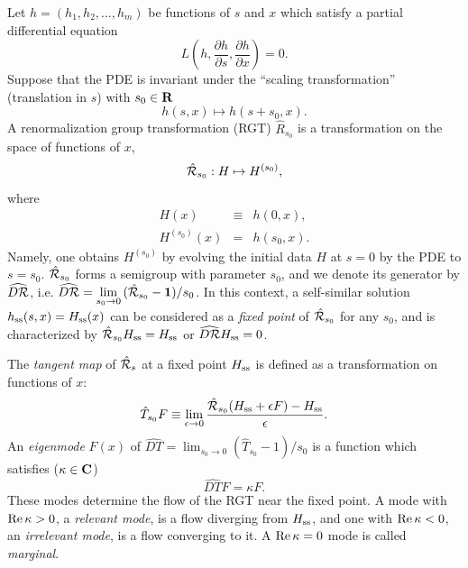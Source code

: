 Let $h=(h_1, h_2, ..., h_m)$ be functions of $s$ and $x$
which satisfy a partial differential equation
\begin{equation}
  \label{eq:PDE}
  L(h,\frac{\partial h}{\partial s},\frac{\partial h}{\partial x}) =0.
\end{equation}
Suppose that the PDE is invariant under the ``scaling transformation''
(translation in $s$) with $s_0 \in {\bf R}$
\begin{equation}
        h(s,x) \mapsto
        h(s+ s_0,  x).
\end{equation}
A renormalization group transformation (RGT)
$\hat R_{s_0}$ is a transformation on the space of functions of $x$,
\begin{equation}
        \hat{\cal R}_{s_0}: H  \mapsto H^{(s_0)} ,
\end{equation}
where
\begin{eqnarray}
        H(x) & \equiv & h(0,x), \\
        H^{(s_0)}(x) & = &
        h(s_0,  x).
\end{eqnarray}
Namely, one obtains $H^{(s_0)}$ by evolving the initial data $H$
at $s=0$ by the PDE to $s=s_0$.
$\hat {\cal R}_{s_0}$ forms a semigroup with parameter $s_0$, and we
denote its generator by $\widehat{D{\cal R}}$, i.e.
$ \displaystyle \widehat{ D{\cal R} }
        = \lim_{{s_0}\rightarrow 0}{(\hat{\cal R}_{s_0}-{\bf 1}) / s_0}$.
In this context, a  self-similar solution $h_{\rm ss}(s,x) = H_{\rm ss}(x)$
can be
considered as a {\em fixed point} of $\hat {\cal R}_{s_0}$ for any
$s_0$, and is
characterized
by  $\hat {\cal R}_{s_0} H_{\rm ss} = H_{\rm ss}$ or
$\widehat{D{\cal R}}H_{\rm ss}=0$.

The {\em tangent map} of $\hat{\cal R}_s$ at a fixed point $H_{\rm ss}$
is defined as a transformation on functions of $x$:
\begin{equation}
        \hat{T}_{s_0} F \equiv \lim_{\epsilon \rightarrow 0}
        \frac{ \hat{\cal R}_{s_0}
        (H_{\rm ss} + \epsilon F ) - H_{\rm ss} } {\epsilon} .
        \label{ind.tan}
\end{equation}
An {\em eigenmode} $F(x)$ of
$\displaystyle \widehat{DT} = \lim_{s_0 \rightarrow 0}
(\hat T_{s_0} - 1) / s_0$ is a function which satisfies
($\kappa \in {\bf C}$)
\begin{equation}
        \widehat{DT} F = \kappa F.
        \label{eq:pert0}
\end{equation}
These modes determine the flow of the RGT near the fixed point.
A mode with ${\rm Re \,} \kappa>0$, a {\em relevant mode},
is a flow diverging from
$H_{\rm ss}$, and one with ${\rm Re \,} \kappa<0$, an {\em irrelevant mode},
is a flow
converging to it. A ${\rm Re \,} \kappa=0$ mode is called {\em marginal}.



